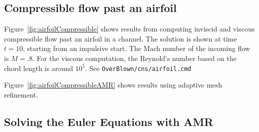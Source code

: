 \documentclass{article}
\begin{document}

% 
% 



\clearpage
\subsection{Compressible flow past an airfoil}


Figure~\ref{fig:airfoilCompressible} shows results from computing inviscid and viscous compressible 
flow past an airfoil in a channel. The solution is shown at time $t=10$,  starting
from an impulsive start. The Mach number of the incoming flow is $M=.8$. 
For the viscous computation, the Reynold's number based on the chord length
is around $10^5$. See {\tt OverBlown/\-cns/\-airfoil.cmd}

Figure~\ref{fig:airfoilCompressibleAMR} shows results using adaptive mesh refinement.





\clearpage
\subsection{Solving the Euler Equations with AMR}
\end{document}
